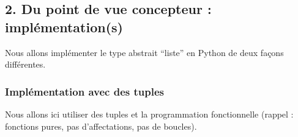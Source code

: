 \documentclass[
  a4paper,
  DIV=11,
  numbers=noendperiod]{scrartcl}
\begin{document}
\hypertarget{du-point-de-vue-concepteur-impluxe9mentations}{%
\subsection{2. Du point de vue concepteur :
implémentation(s)}\label{du-point-de-vue-concepteur-impluxe9mentations}}

Nous allons implémenter le type abstrait ``liste'' en Python de deux
façons différentes.

\hypertarget{impluxe9mentation-avec-des-tuples}{%
\subsubsection{Implémentation avec des
tuples}\label{impluxe9mentation-avec-des-tuples}}

Nous allons ici utiliser des tuples et la programmation fonctionnelle
(rappel : fonctions pures, pas d'affectations, pas de boucles).
\end{document}
